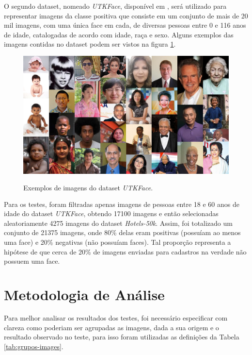 O segundo dataset, nomeado \textit{UTKFace}, disponível em \cite{utkface}, será utilizado para representar imagens da classe positiva que consiste em um conjunto de mais de 20 mil imagens, com uma única face em cada, de diversas pessoas entre 0 e 116 anos de idade, catalogadas de acordo com idade, raça e sexo. Alguns exemplos das imagens contidas no dataset podem ser vistos na figura \ref{fig:exemplos-utk}.

\begin{figure}[htb]
    \centering
    \caption{Exemplos de imagens do dataset \textit{UTKFace}.}
    \includegraphics[scale=.3]{figs/exemplos-utk.png}
    \label{fig:exemplos-utk}
 \end{figure}

Para os testes, foram filtradas apenas imagens de pessoas entre 18 e 60 anos de idade do dataset \textit{UTKFace}, obtendo 17100 imagens e então selecionadas aleatoriamente 4275 imagens do dataset \textit{Hotels-50k}. Assim, foi totalizado um conjunto de 21375 imagens, onde 80\% delas eram positivas (possuíam ao menos uma face) e 20\% negativas (não possuíam faces). Tal proporção representa a hipótese de que cerca de 20\% de imagens enviadas para cadastros na verdade não possuem uma face.

\section{Metodologia de Análise}

Para melhor analisar os resultados dos testes, foi necessário especificar com clareza como poderiam ser agrupadas as imagens, dada a sua origem e o resultado observado no teste, para isso foram utilizadas as definições da Tabela \ref{tab:grupos-images}. 

